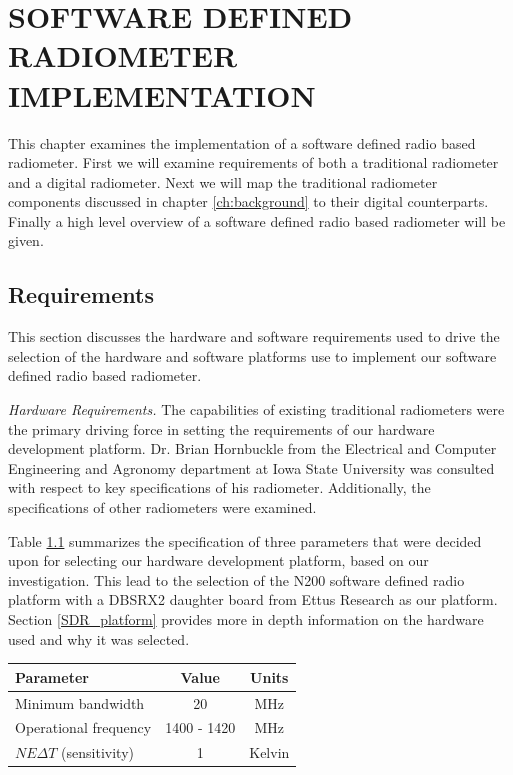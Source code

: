 \chapter{SOFTWARE DEFINED RADIOMETER IMPLEMENTATION}\label{ch:implementation}

This chapter examines the implementation of a software defined radio based radiometer.  First we will examine requirements of both a traditional radiometer and a digital radiometer.  Next we will map the traditional radiometer components discussed in chapter \ref{ch:background} to their digital counterparts.  Finally a high level overview of a software defined radio based radiometer will be given.

\section{Requirements}\label{requirements}

This section discusses the hardware and software requirements used to drive the selection of the hardware and software platforms use to implement our software defined radio based radiometer.  

\emph{Hardware Requirements.}  The capabilities of existing traditional radiometers were the primary driving force in setting the requirements of our hardware development platform.  Dr. Brian Hornbuckle from the Electrical and Computer Engineering and Agronomy department at Iowa State University was consulted with respect to key specifications of his radiometer.  Additionally, the specifications of other radiometers were examined. 

Table \ref{rad_performance} summarizes the specification of three parameters that were decided upon for selecting our hardware development platform, based on our investigation.  This lead to the selection of the N200 software defined radio platform with a DBSRX2 daughter board from Ettus Research as our platform.  Section \ref{SDR_platform} provides more in depth information on the hardware used and why it was selected.

\begin{table}[h!tb] \centering
{}
\label{rad_performance}
\begin{tabular}{lcc} \hline
\textbf{Parameter} & \textbf{Value} & \textbf{Units} \\ \hline
Minimum bandwidth & 20 & MHz \\
Operational frequency & 1400 - 1420 & MHz \\
$NE\Delta T$ (sensitivity) & 1 & Kelvin \\ \hline
\end{tabular}
\end{table}

